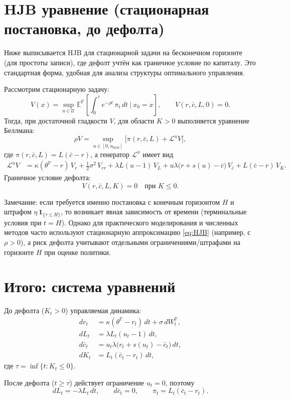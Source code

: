 \documentclass[11pt]{article}
\newcommand{\E}{\mathbb{E}}
\newcommand{\Pp}{\mathbb{P}}
\newcommand{\1}{\mathbf{1}}
\begin{document}
\section{HJB уравнение (стационарная постановка, до дефолта)}
Ниже выписывается HJB для стационарной задачи на бесконечном горизонте (для простоты записи), где дефолт учтён как граничное условие по капиталу. Это стандартная форма, удобная для анализа структуры оптимального управления.

Рассмотрим стационарную задачу:
\begin{equation}
V(x)
=
\sup_{u\in\mathcal{U}}
\E^{\Pp}\left[
\int_{0}^{\tau}
e^{-\rho t}\,\pi_t\,dt
\ \Big|\ x_0=x
\right],
\qquad
V(r,\bar c,L,0)=0.
\label{eq:stationary_infinite}
\end{equation}
Тогда, при достаточной гладкости $V$, для области $K>0$ выполняется уравнение Беллмана:
\begin{equation}
\rho V
=
\sup_{u\in[0,u_{\max}]}
\Big[
\pi(r,\bar c,L)
+
\mathcal{L}^{u}V
\Big],
\label{eq:HJB}
\end{equation}
где $\pi(r,\bar c,L)=L(\bar c-r)$, а генератор $\mathcal{L}^{u}$ имеет вид
\begin{align}
\mathcal{L}^{u}V
&=
\kappa(\theta^{\Pp}-r)\,V_r
+\frac{1}{2}\sigma^2\,V_{rr}
+\lambda L(u-1)\,V_L
+u\lambda\big(r+s(u)-\bar c\big)\,V_{\bar c}
+L(\bar c-r)\,V_K.
\label{eq:generator}
\end{align}
Граничное условие дефолта:
\begin{equation}
V(r,\bar c,L,K)=0\quad \text{при } K\le 0.
\label{eq:bc_default}
\end{equation}

Замечание: если требуется именно постановка с конечным горизонтом $H$ и штрафом $\eta\,\1_{\{\tau\le H\}}$, то возникает явная зависимость от времени (терминальные условия при $t=H$). Однако для практического моделирования и численных методов часто используют стационарную аппроксимацию \eqref{eq:HJB} (например, с $\rho>0$), а риск дефолта учитывают отдельными ограничениями/штрафами на горизонте $H$ при оценке политики.

\section{Итого: система уравнений}
До дефолта ($K_t>0$) управляемая динамика:
\begin{align}
dr_t &= \kappa(\theta^{\Pp}-r_t)\,dt + \sigma\,dW_t^{\Pp},\\
dL_t &= \lambda L_t(u_t-1)\,dt,\\
d\bar c_t &= u_t\lambda\big(r_t + s(u_t) - \bar c_t\big)\,dt,\\
dK_t &= L_t(\bar c_t - r_t)\,dt,
\end{align}
где $\tau=\inf\{t:K_t\le 0\}$.

После дефолта ($t\ge\tau$) действует ограничение $u_t=0$, поэтому
\[
dL_t=-\lambda L_t\,dt,\qquad d\bar c_t=0,\qquad \pi_t=L_t(\bar c_t-r_t).
\]
\end{document}
